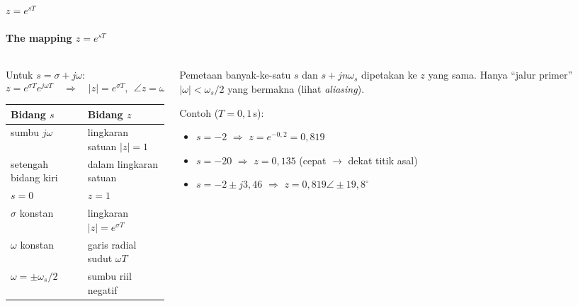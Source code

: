 \documentclass[aspectratio=169,10pt]{beamer}
\begin{document}
\begin{frame}{$z = e^{sT}$}
	\framesubtitle{The mapping $z = e^{sT}$}
	\begin{columns}[T]
		\begin{column}{0.48\textwidth}
			\small
			Untuk $s = \sigma + j\omega$:
			\[
				z = e^{\sigma T}e^{j\omega T}\quad\Rightarrow\quad |z| = e^{\sigma T},\ \ \angle z = \omega T
			\]
			\renewcommand{\arraystretch}{1.3}
			\begin{tabular}{@{}l l@{}}
				\toprule
				\textbf{Bidang $s$} & \textbf{Bidang $z$} \\
				\midrule
				sumbu $j\omega$ & lingkaran satuan $|z|=1$ \\
				setengah bidang kiri & dalam lingkaran satuan \\
				$s=0$ & $z=1$ \\
				$\sigma$ konstan & lingkaran $|z| = e^{\sigma T}$ \\
				$\omega$ konstan & garis radial sudut $\omega T$ \\
				$\omega = \pm\omega_s/2$ & sumbu riil negatif \\
				\bottomrule
			\end{tabular}
		\end{column}
		\begin{column}{0.48\textwidth}
			\small
			\begin{alertblock}{Pemetaan banyak-ke-satu}
				$s$ dan $s + jn\omega_s$ dipetakan ke $z$ yang sama. Hanya ``jalur primer'' $|\omega| < \omega_s/2$ yang bermakna (lihat \textit{aliasing}).
			\end{alertblock}
			\vspace{0.1cm}
			Contoh ($T=0{,}1$\,s):
			\begin{itemize}
				\item $s=-2$ $\Rightarrow$ $z = e^{-0{,}2} = 0{,}819$
				\item $s=-20$ $\Rightarrow$ $z = 0{,}135$ (cepat $\rightarrow$ dekat titik asal)
				\item $s=-2 \pm j3{,}46$ $\Rightarrow$ $z = 0{,}819\angle\!\pm 19{,}8^\circ$
			\end{itemize}
		\end{column}
	\end{columns}
\end{frame}
\end{document}
